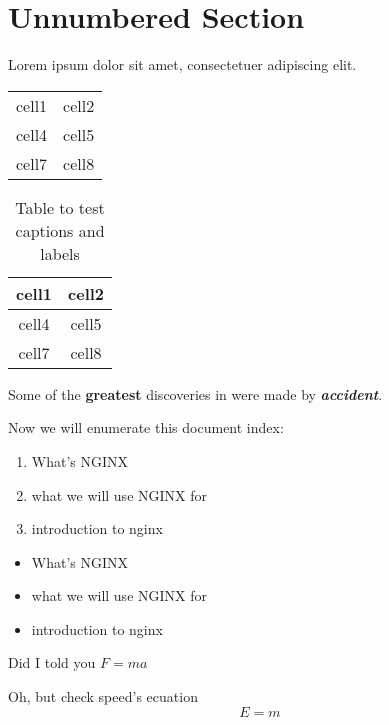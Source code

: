 \documentclass[10pt, a4paper]{article} %
\begin{document}
\section*{Unnumbered Section}
Lorem ipsum dolor sit amet, consectetuer adipiscing elit.  

\begin{center} %
    \begin{tabular}{  c c }       
     cell1 & cell2 \\ 
     cell4 & cell5 \\  
     cell7 & cell8    
    \end{tabular}
\end{center}

\begin{table}[ht!]
    \begin{center} %
        \begin{tabular}{ |c|c| }
        \hline
        cell1 & cell2 \\ 
        \hline
        cell4 & cell5 \\
        \hline  
        cell7 & cell8 \\ 
        \hline 
        \end{tabular}
    \end{center}
    \caption{Table to test captions and labels}
    \label{table:data2}
\end{table}
        



Some of the \textbf{greatest} discoveries in were made by \textbf{\textit{accident}}.

Now we will enumerate this document index:


\begin{enumerate} %
    \item What's NGINX
    \item what we will use NGINX for
    \item introduction to nginx
\end{enumerate}

\begin{itemize} %
    \item What's NGINX
    \item what we will use NGINX for
    \item introduction to nginx
\end{itemize}

Did I told you $F=ma$

Oh, but check speed's ecuation
\begin{equation}
    E=m
\end{equation}
\end{document}
